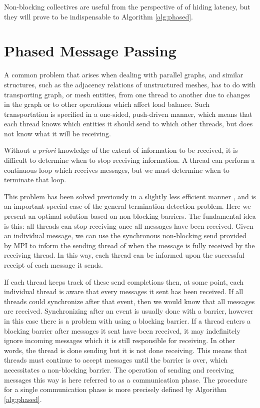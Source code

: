 \documentclass[final,1p,times]{elsarticle}
\begin{document}
Non-blocking collectives are useful from the perspective of
of hiding latency, but they will prove to be indispensable to
Algorithm \ref{alg:phased}.

\section{Phased Message Passing}
\label{sec:phased}

A common problem that arises when dealing with parallel graphs,
and similar structures, such as the adjacency relations of unstructured
meshes, has to do with transporting graph, or mesh entities, from
one thread to another
due to changes in the graph or to other operations which affect
load balance.
Such transportation is specified in a one-sided,
push-driven manner, which means that each thread knows which
entities it should send to which other threads, but does
not know what it will be receiving.

Without {\it a priori} knowledge of the extent of information to be
received, it is difficult to determine when to stop receiving
information.
A thread can perform a continuous loop which receives messages,
but we must determine when to terminate that loop.

This problem has been solved previously in a slightly less efficient
manner \cite{Ovcharenko2012140}, and is an important special case
of the general termination detection problem.
Here we present an optimal solution based on non-blocking barriers.
The fundamental idea is this: all threads can stop receiving
once all messages have been received.
Given an individual message, we can use the synchronous non-blocking
send provided by MPI to inform the sending thread of when the message
is fully received by the receiving thread.
In this way, each thread can be informed upon the successful receipt
of each message it sends.

If each thread keeps track of these send completions then,
at some point, each individual thread is aware that every
messages it sent has been received.
If all threads could synchronize after that event, then
we would know that all messages are received.
Synchronizing after an event is usually done with a barrier,
however in this case there is a problem with using a blocking barrier.
If a thread enters a blocking barrier after messages it sent
have been received, it may indefinitely ignore incoming messages
which it is still responsible for receiving.
In other words, the thread is done sending but it is not done receiving.
This means that threads must continue to accept messages until
the barrier is over, which necessitates a non-blocking barrier.
The operation of sending and receiving messages this way
is here referred to as a communication phase.
The procedure for a single communication phase is more precisely defined
by Algorithm \ref{alg:phased}.
\end{document}
